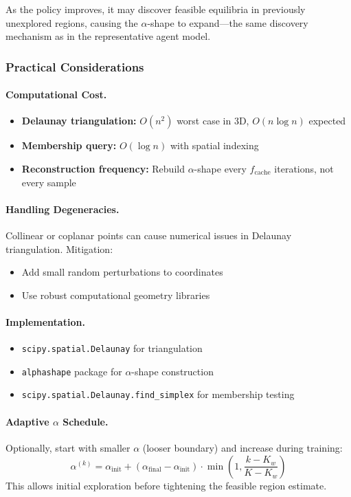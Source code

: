 As the policy improves, it may discover feasible equilibria in previously unexplored regions, causing the $\alpha$-shape to expand—the same discovery mechanism as in the representative agent model.


\subsubsection{Practical Considerations}

\paragraph{Computational Cost.}
\begin{itemize}
    \item \textbf{Delaunay triangulation:} $O(n^2)$ worst case in 3D, $O(n \log n)$ expected
    \item \textbf{Membership query:} $O(\log n)$ with spatial indexing
    \item \textbf{Reconstruction frequency:} Rebuild $\alpha$-shape every $f_{\text{cache}}$ iterations, not every sample
\end{itemize}

\paragraph{Handling Degeneracies.}
Collinear or coplanar points can cause numerical issues in Delaunay triangulation. Mitigation:
\begin{itemize}
    \item Add small random perturbations to coordinates
    \item Use robust computational geometry libraries
\end{itemize}

\paragraph{Implementation.}
\begin{itemize}
    \item \texttt{scipy.spatial.Delaunay} for triangulation
    \item \texttt{alphashape} package for $\alpha$-shape construction
    \item \texttt{scipy.spatial.Delaunay.find\_simplex} for membership testing
\end{itemize}

\paragraph{Adaptive $\alpha$ Schedule.}
Optionally, start with smaller $\alpha$ (looser boundary) and increase during training:
\begin{equation}
    \alpha^{(k)} = \alpha_{\text{init}} + (\alpha_{\text{final}} - \alpha_{\text{init}}) \cdot \min\left(1, \frac{k - K_w}{K - K_w}\right)
\end{equation}
This allows initial exploration before tightening the feasible region estimate.

